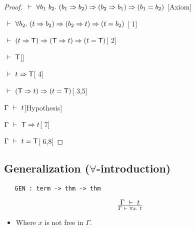 \begin{proof}
\item $\turn\uquant{b_1\ b_2}(b_1\imp b_2)\imp(b_2\imp b_1)\imp(b_1=b_2)$
\hfill [Axiom]
\item $\ \vdash\ \forall b_2.\ (t\Rightarrow b_2)\Rightarrow(b_2\Rightarrow t)\Rightarrow(t=b_2)$
\hfill [ 1]
\item $\ \vdash\ (t\Rightarrow{\sf T})\Rightarrow({\sf T}\Rightarrow t)\Rightarrow(t={\sf T})$\hfill [ 2]
\item $\ \vdash\ {\sf T}$\hfill []
\item $\ \vdash\  t\Rightarrow{\sf T}$\hfill [ 4]
\item $\ \vdash\ ({\sf T}\Rightarrow t)\Rightarrow(t={\sf T})$\hfill [ 3,5]
\item $\Gamma \ \vdash\  t$\hfill [Hypothesis]
\item $\Gamma\ \vdash\ {\sf T}\Rightarrow t$\hfill [ 7]
\item $\Gamma\ \vdash\  t={\sf T}$\hfill [ 6,8]
\end{proof}


\subsection{\texorpdfstring{Generalization ($\forall$-introduction)}{Generalization (forall-introduction)}}%


\begin{holboxed}
\begin{verbatim}
   GEN : term -> thm -> thm
\end{verbatim}
\end{holboxed}

\label{avra_gen}

\vspace{12pt plus2pt minus1pt}

$$\Gamma\ \vdash\  t\over\Gamma\ \vdash\ \forall x.\  t$$
\begin{itemize}
\item Where $x$ is not free in $\Gamma$.
\end{itemize}

\vspace{12pt plus2pt minus1pt}

